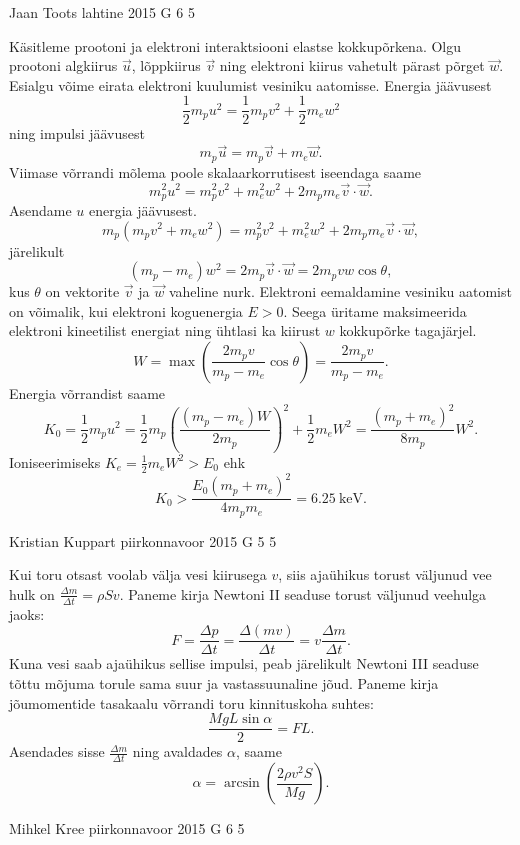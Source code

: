 \documentclass[11pt, twoside]{article}
\begin{document}
{%
{Jaan Toots} %
{lahtine} %
{2015} %
{G 6} %
{5} %
{

\ifSolution
Käsitleme prootoni ja elektroni interaktsiooni elastse kokkupõrkena. Olgu prootoni algkiirus $\vec{u}$, lõppkiirus $\vec{v}$ ning elektroni kiirus vahetult pärast põrget $\vec{w}$. Esialgu võime eirata elektroni kuulumist vesiniku aatomisse. Energia jäävusest
\[
\frac{1}{2}m_p u^2 = \frac{1}{2}m_p v^2 + \frac{1}{2}m_e w^2
\]
ning impulsi jäävusest
\[
m_p \vec{u} = m_p \vec{v} + m_e \vec{w}.
\]
Viimase võrrandi mõlema poole skalaarkorrutisest iseendaga saame
\[
m_p^2 u^2 = m_p^2 v^2 + m_e^2 w^2 + 2 m_p m_e \vec{v}\cdot \vec{w}.
\]
Asendame $u$ energia jäävusest.
\[
m_p ( m_p v^2 + m_e w^2 ) = m_p^2 v^2 + m_e^2 w^2 + 2 m_p m_e \vec{v}\cdot \vec{w},
\]
järelikult
\[
( m_p - m_e ) w^2 = 2 m_p \vec{v}\cdot\vec{w} = 2 m_p vw \cos\theta,
\]
kus $\theta$ on vektorite $\vec{v}$ ja $\vec{w}$ vaheline nurk. Elektroni eemaldamine vesiniku aatomist on võimalik, kui elektroni koguenergia $E>0$. Seega üritame maksimeerida elektroni kineetilist energiat ning ühtlasi ka kiirust $w$ kokkupõrke tagajärjel.
\[
W = \max\left(\frac{2 m_p v}{m_p - m_e}\cos\theta\right) = \frac{2 m_p v}{m_p - m_e}.
\]
Energia võrrandist saame
\[
K_0 = \frac{1}{2}m_p u^2 = \frac{1}{2}m_p \left(\frac{( m_p - m_e ) W}{2 m_p}\right)^2 + \frac{1}{2}m_e W^2 = \frac{(m_p + m_e)^2}{8 m_p} W^2.
\]
Ioniseerimiseks $K_e = \frac{1}{2}m_e W^2 > E_0$ ehk
\[
K_0 > \frac{E_0 (m_p + m_e)^2}{4 m_p m_e} = \SI{6.25}{\kilo\electronvolt}.
\]
\fi
}

{Kristian Kuppart} %
{piirkonnavoor} %
{2015} %
{G 5} %
{5} %
{

\ifSolution
Kui toru otsast voolab välja vesi kiirusega $v$, siis ajaühikus torust väljunud vee hulk on $\frac{\Delta m}{\Delta t}=\rho S v$. Paneme kirja Newtoni II seaduse torust väljunud veehulga jaoks: 
\[ F=\frac{\Delta p}{\Delta t}=\frac{\Delta(mv)}{\Delta t}=v \frac{\Delta m}{\Delta t}. \]
Kuna vesi saab ajaühikus sellise impulsi, peab järelikult Newtoni III seaduse tõttu mõjuma torule sama suur ja vastassuunaline jõud. Paneme kirja jõumomentide tasakaalu võrrandi toru kinnituskoha suhtes: 
\[ \frac{MgL\sin \alpha}{2}=FL. \]
Asendades sisse $\frac{\Delta m}{\Delta t}$ ning avaldades $\alpha$, saame
\[ \alpha=\arcsin \left(\frac{2\rho v^2 S}{Mg}\right). \]
\fi
}

{Mihkel Kree} %
{piirkonnavoor} %
{2015} %
{G 6} %
{5} %
{

}}
\end{document}

